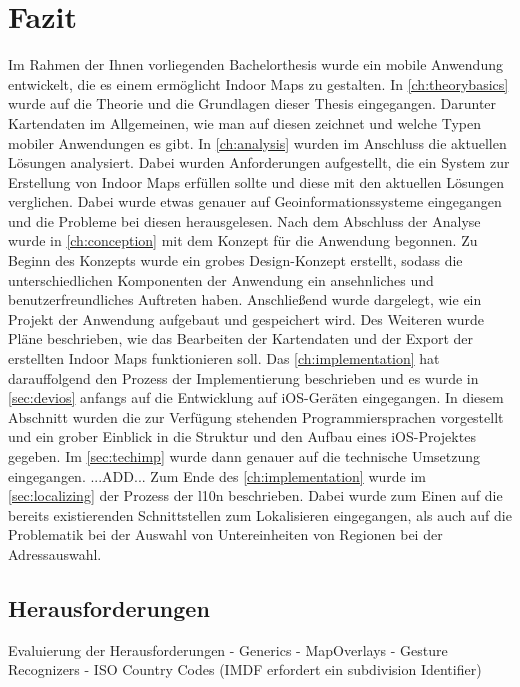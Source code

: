 \chapter{Fazit}
\label{ch:conclusion}
Im Rahmen der Ihnen vorliegenden Bachelorthesis wurde ein mobile Anwendung entwickelt, die es einem ermöglicht Indoor Maps zu gestalten.
In \autoref{ch:theorybasics} wurde auf die Theorie und die Grundlagen dieser Thesis eingegangen.
Darunter Kartendaten im Allgemeinen, wie man auf diesen zeichnet und welche Typen mobiler Anwendungen es gibt.\pbreak%
%
In \autoref{ch:analysis} wurden im Anschluss die aktuellen Lösungen analysiert.
Dabei wurden Anforderungen aufgestellt, die ein System zur Erstellung von Indoor Maps erfüllen sollte und diese mit den aktuellen Lösungen verglichen.
Dabei wurde etwas genauer auf Geoinformationssysteme eingegangen und die Probleme bei diesen herausgelesen.\pbreak%
%
Nach dem Abschluss der Analyse wurde in \autoref{ch:conception} mit dem Konzept für die Anwendung begonnen.
Zu Beginn des Konzepts wurde ein grobes Design-Konzept erstellt, sodass die unterschiedlichen Komponenten der Anwendung ein ansehnliches und benutzerfreundliches Auftreten haben.
Anschließend wurde dargelegt, wie ein Projekt der Anwendung aufgebaut und gespeichert wird.
Des Weiteren wurde Pläne beschrieben, wie das Bearbeiten der Kartendaten und der Export der erstellten Indoor Maps funktionieren soll.\pbreak%
%
Das \autoref{ch:implementation} hat darauffolgend den Prozess der Implementierung beschrieben und es wurde in \autoref{sec:devios} anfangs auf die Entwicklung auf iOS-Geräten eingegangen.
In diesem Abschnitt wurden die zur Verfügung stehenden Programmiersprachen vorgestellt und ein grober Einblick in die Struktur und den Aufbau eines iOS-Projektes gegeben.
Im \autoref{sec:techimp} wurde dann genauer auf die technische Umsetzung eingegangen.
...ADD...\pbreak%
%
Zum Ende des \autoref{ch:implementation} wurde im \autoref{sec:localizing} der Prozess der \Gls{l10n} beschrieben.
Dabei wurde zum Einen auf die bereits existierenden Schnittstellen zum Lokalisieren eingegangen, als auch auf die Problematik bei der Auswahl von Untereinheiten von Regionen bei der Adressauswahl.

\section{Herausforderungen}
Evaluierung der Herausforderungen
- Generics
- MapOverlays
- Gesture Recognizers
- ISO Country Codes (IMDF erfordert ein subdivision Identifier)

